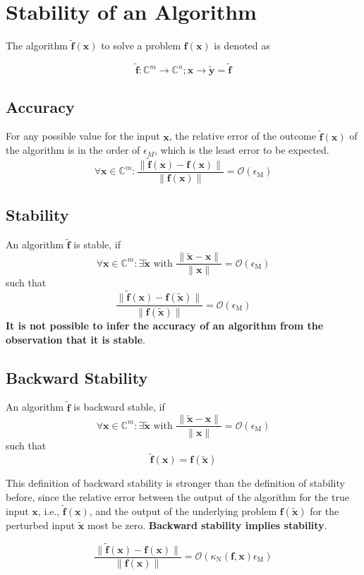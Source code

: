 \documentclass[english]{latex4ei/latex4ei_sheet}
\begin{document}
\section{Stability of an Algorithm}
\begin{sectionbox}
    The algorithm $\mathbf{\tilde{f}}(\mathbf{x})$ to solve a problem $\mathbf{f}(\mathbf{x})$ is denoted as

    $$\mathbf{\tilde{f}}: \mathbb{C}^m \to \mathbb{C}^n; \mathbf{x}\to \tilde{\mathbf{y}} = \mathbf{\tilde{f}}$$

    \subsection{Accuracy}
    For any possible value for the input $\mathbf{x}$, the relative error of the outcome $\mathbf{\tilde{f}}(\mathbf{x})$ of the algorithm is in the order of $\epsilon_M$, which is the least error to be expected.
    $$\forall \mathbf{x}\in\mathbb{C}^{m}:\frac{\parallel \mathbf{\tilde{f}}(\mathbf{x}) -\mathbf{f}(\mathbf{x})\parallel}{\parallel\mathbf{f}(\mathbf{x}) \parallel} = \mathcal{O}(\epsilon_\text{M})$$

    \subsection{Stability}
    An algorithm $\tilde{\mathbf{f}}$ is stable, if
    $$\forall \mathbf{x} \in \mathbb{C}^{m}: \exists \mathbf{\tilde{x}} \text{ with } \frac{\parallel \mathbf{\tilde{x}} - \mathbf{x}\parallel}{\parallel \mathbf{x}\parallel} = \mathcal{O}(\epsilon_\text{M})$$
    such that
    $$\frac{\parallel \mathbf{\tilde{f}}(\mathbf{x}) -\mathbf{f}(\mathbf{\tilde{x}})\parallel}{\parallel\mathbf{f}(\mathbf{\tilde{x}}) \parallel} = \mathcal{O}(\epsilon_\text{M})$$
    \textbf{It is not possible to infer the accuracy of an algorithm from the observation that it is stable}.

    \subsection{Backward Stability}
    An algorithm $\tilde{\mathbf{f}}$ is backward stable, if
    $$\forall \mathbf{x} \in \mathbb{C}^{m}: \exists \mathbf{\tilde{x}} \text{ with } \frac{\parallel \mathbf{\tilde{x}} - \mathbf{x}\parallel}{\parallel \mathbf{x}\parallel} = \mathcal{O}(\epsilon_\text{M})$$
    such that
    $$\tilde{\mathbf{f}}(\mathbf{x}) = \mathbf{f}(\tilde{\mathbf{x}})$$

    This definition of backward stability is stronger than the definition of stability before, since the relative error between the output of the algorithm for the true input $\mathbf{x}$, i.e., $\tilde{\mathbf{f}}(\mathbf{x})$, and the output of the underlying problem $\mathbf{f}(\tilde{\mathbf{x}})$ for the perturbed input $\tilde{\mathbf{x}}$ most be zero. \textbf{Backward stability implies stability}.

    $$\frac{\parallel \mathbf{\tilde{f}}(\mathbf{x}) -\mathbf{f}(\mathbf{x})\parallel}{\parallel\mathbf{f}(\mathbf{x}) \parallel} = \mathcal{O}(\kappa_\text{N}(\mathbf{f},\mathbf{x})\epsilon_\text{M})$$
\end{sectionbox}
\end{document}
